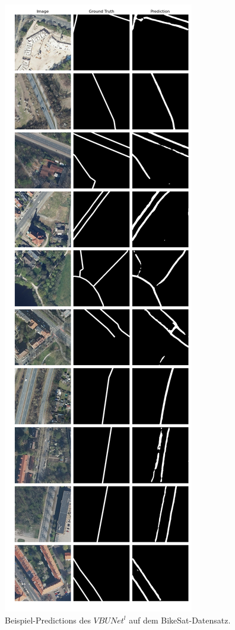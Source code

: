 \begin{figure}
	\centering
	\includegraphics[width=.41\textwidth]{Bilder/Samples-BikeSat/vbunet-l.png} 
	\caption{Beispiel-Predictions des $VBUNet^l$ auf dem BikeSat-Datensatz.}
	\label{fig:bikesat-samples-vbunet-l}
\end{figure}

